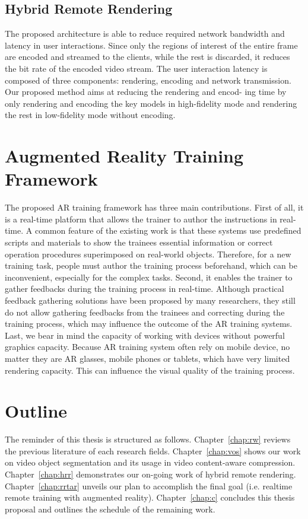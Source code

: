 \subsection{Hybrid Remote Rendering}

The proposed architecture is able to reduce required network bandwidth and latency in user interactions. Since only the regions of interest of the entire frame are encoded and streamed to the clients, while the rest is discarded, it reduces the bit rate of the encoded video stream. The user interaction latency is composed of three components: rendering, encoding and network transmission. Our proposed method aims at reducing the rendering and encod- ing time by only rendering and encoding the key models in high-fidelity mode and rendering the rest in low-fidelity mode without encoding.

\section{Augmented Reality Training Framework}

The proposed AR training framework has three main contributions.
First of all, it is a real-time platform that allows the trainer to author the instructions in real-time. A common feature of the existing work is that these systems use predefined scripts and materials to show the trainees essential information or correct operation procedures superimposed on real-world objects. Therefore, for a new training task, people must author the training process beforehand, which can be inconvenient, especially for the complex tasks.
Second, it enables the trainer to gather feedbacks during the training process in real-time. Although practical feedback gathering solutions have been proposed by many researchers, they still do not allow gathering feedbacks from the trainees and correcting during the training process, which may influence the outcome of the AR training systems.
Last, we bear in mind the capacity of working with devices without powerful graphics capacity. Because AR training system often rely on mobile device, no matter they are AR glasses, mobile phones or tablets, which have very limited rendering capacity. This can influence the visual quality of the training process.

\section{Outline}

The reminder of this thesis is structured as follows. Chapter~\ref{chap:rw} reviews the previous literature of each research fields. Chapter~\ref{chap:vos} shows our work on video object segmentation and its usage in video content-aware compression. Chapter~\ref{chap:hrr} demonstrates our on-going work of hybrid remote rendering. Chapter~\ref{chap:rrtar} unveils our plan to accomplish the final goal (i.e. realtime remote training with augmented reality). Chapter~\ref{chap:c} concludes this thesis proposal and outlines the schedule of the remaining work.
